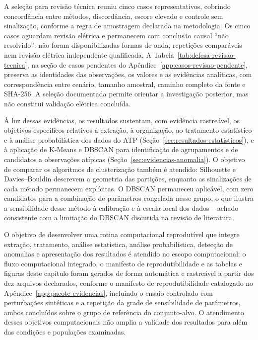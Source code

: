 \documentclass[
	12pt,				%
	openright,			%
	oneside,			%
	a4paper,			%
	chapter=TITLE,		%
	section=TITLE,		%
	subsection=TITLE,	%
	subsubsection=TITLE,%
	english,			%
	brazilian			%
	]{abntex2}
\theoremstyle{definition}
\begin{document}
A seleção para revisão técnica reuniu cinco casos representativos,
cobrindo concordância entre métodos, discordância, escore elevado e controle
sem sinalização, conforme a regra de amostragem declarada na metodologia.
Os cinco casos aguardam revisão elétrica e permanecem com conclusão causal
``não resolvido'': não foram disponibilizadas formas de onda, repetições
comparáveis nem revisão elétrica independente qualificada. A
Tabela~\ref{tab:defesa-revisao-tecnica}, na seção de casos pendentes do
Apêndice~\ref{app:casos-revisao-pendente}, preserva as identidades das
observações, os valores e as evidências analíticas, com correspondência
entre cenário, tamanho amostral, caminho completo da fonte e SHA-256.
A seleção documentada permite orientar a investigação posterior, mas não
constitui validação elétrica concluída.

À luz dessas evidências, os resultados sustentam, com evidência rastreável,
os objetivos específicos
relativos à extração, à organização, ao tratamento estatístico e à análise
probabilística dos dados do ATP (Seção~\ref{sec:resultados-estatisticos}), e
à aplicação de K-Means e DBSCAN para identificação de agrupamentos e de
candidatos a observações atípicas (Seção~\ref{sec:evidencias-anomalia}). O
objetivo de comparar os algoritmos de clusterização também é atendido:
Silhouette e Davies--Bouldin descrevem a geometria das partições,
enquanto as sinalizações de cada método permanecem explícitas. O
DBSCAN permaneceu aplicável, com zero candidatos para a
combinação de parâmetros congelada nesse grupo, o que ilustra a
sensibilidade desse método à calibração e à escala local dos dados --
achado consistente com a limitação do DBSCAN discutida na revisão de
literatura.

O objetivo de desenvolver uma rotina computacional reprodutível que integre
extração, tratamento, análise estatística, análise probabilística, detecção
de anomalias e apresentação dos resultados é atendido no escopo computacional: o
fluxo computacional integrado, o manifesto de reprodutibilidade e as tabelas e figuras
deste capítulo foram gerados de forma automática e rastreável a partir dos
dez arquivos declarados, conforme o manifesto de reprodutibilidade
catalogado no Apêndice~\ref{app:pacote-evidencias}, incluindo o ensaio controlado com
perturbações sintéticas e a repetição da grade de sensibilidade de
parâmetros, ambos concluídos sobre o grupo de referência do conjunto-alvo.
O atendimento desses objetivos computacionais não amplia a validade dos
resultados para além das condições e populações examinadas.
\end{document}
